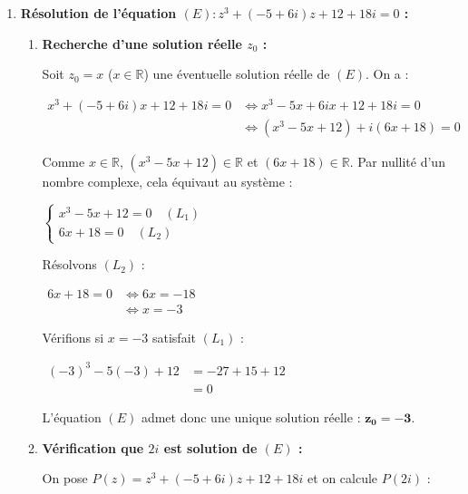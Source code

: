 \documentclass[12pt,a4paper]{article}
\begin{document}
\begin{enumerate}
    \item \textbf{Résolution de l'équation $(E) : z^3 + (-5 + 6i)z + 12 + 18i = 0$ :}
    
    \begin{enumerate}
        \item \textbf{Recherche d'une solution réelle $z_0$ :}
        
        Soit $z_0 = x$ ($x \in \mathbb{R}$) une éventuelle solution réelle de $(E)$. On a :
        
        $
        \begin{aligned}
            x^3 + (-5 + 6i)x + 12 + 18i = 0 &\iff x^3 - 5x + 6ix + 12 + 18i = 0\\
            &\iff (x^3 - 5x + 12) + i(6x + 18) = 0
        \end{aligned}
        $
        
        Comme $x \in \mathbb{R}$, $(x^3 - 5x + 12) \in \mathbb{R}$ et $(6x + 18) \in \mathbb{R}$. Par nullité d'un nombre complexe, cela équivaut au système :
        
        $
        \begin{cases}
            x^3 - 5x + 12 = 0 \quad (L_1) \\
            6x + 18 = 0 \quad (L_2)
        \end{cases}
        $
        
        Résolvons $(L_2)$ :
        
        $
        \begin{aligned}
            6x + 18 = 0 &\iff 6x = -18\\
            &\iff x = -3
        \end{aligned}
        $
        
        Vérifions si $x = -3$ satisfait $(L_1)$ :
        
        $
        \begin{aligned}
            (-3)^3 - 5(-3) + 12 &= -27 + 15 + 12\\
            &= 0
        \end{aligned}
        $
        
        L'équation $(E)$ admet donc une unique solution réelle : $\mathbf{z_0 = -3}$.

        \item \textbf{Vérification que $2i$ est solution de $(E)$ :}
        
        On pose $P(z) = z^3 + (-5 + 6i)z + 12 + 18i$ et on calcule $P(2i)$ :
        

\end{enumerate}
\end{enumerate}
\end{document}
